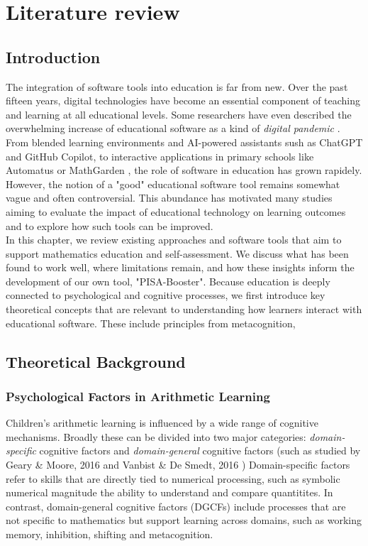 \chapter{Literature review}


\section{Introduction}
The integration of software tools into education is far from new. Over the past fifteen years, digital technologies have become an essential component of teaching and learning at all educational levels.
Some researchers have even described the overwhelming increase of educational software as a kind of \textit{digital pandemic} \cite{dancsa_digital_2023}.
From blended learning environments and AI-powered assistants sush as ChatGPT and GitHub Copilot, to interactive applications in primary schools like Automatus \cite{automatus} or MathGarden \cite{rekentuin}, the role of software in education has grown rapidely. \\

However, the notion of a "good" educational software tool remains somewhat vague and often controversial. 
This abundance has motivated many studies aiming to evaluate the impact of educational technology on learning outcomes and to explore how such tools can be improved. \\

In this chapter, we review existing approaches and software tools that aim to support mathematics education and self-assessment. 
We discuss what has been found to work well, where limitations remain, and how these insights inform the development of our own tool, "PISA-Booster". 
Because education is deeply connected to psychological and cognitive processes, we first introduce key theoretical concepts that are relevant to understanding how learners interact with educational software.
These include principles from metacognition, 

\section{Theoretical Background}
\subsection{Psychological Factors in Arithmetic Learning}
Children's arithmetic learning is influenced by a wide range of cognitive mechanisms.
Broadly these can be divided into two major categories: \textit{domain-specific} cognitive factors and \textit{domain-general} cognitive factors (such as studied by Geary \& Moore, 2016 \cite{geary_chapter_2016} and Vanbist \& De Smedt, 2016 \cite{vanbinst_chapter_2016})
Domain-specific factors refer to skills that are directly tied to numerical processing, such as symbolic numerical magnitude  the ability to understand and compare quantitites. 
In contrast, domain-general cognitive factors (DGCFs) include processes that are not specific to mathematics but support learning across domains, such as working memory, inhibition, shifting and metacognition. \\

